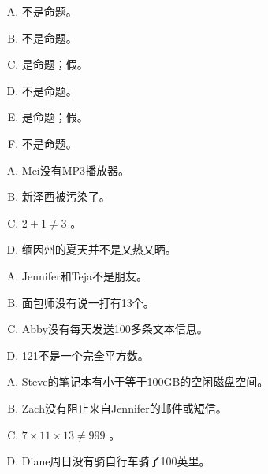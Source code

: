 {{        %
        \begin{practices}
            \begin{enumerate}[A.]
                \item 不是命题。
                \item 不是命题。
                \item 是命题；假。
                \item 不是命题。
                \item 是命题；假。
                \item 不是命题。
            \end{enumerate}
        \end{practices}

        \begin{practices}
            \begin{enumerate}[A.]
                \item Mei没有MP3播放器。
                \item 新泽西被污染了。
                \item $2 + 1 \neq 3$ 。
                \item 缅因州的夏天并不是又热又晒。
            \end{enumerate}
        \end{practices}

        \begin{practices}
            \begin{enumerate}[A.]
                \item Jennifer和Teja不是朋友。
                \item 面包师没有说一打有13个。
                \item Abby没有每天发送100多条文本信息。
                \item 121不是一个完全平方数。
            \end{enumerate}
        \end{practices}

        \begin{practices}
            \begin{enumerate}[A.]
                \item Steve的笔记本有小于等于100GB的空闲磁盘空间。
                \item Zach没有阻止来自Jennifer的邮件或短信。
                \item $7 \times 11 \times 13 \neq 999$ 。
                \item Diane周日没有骑自行车骑了100英里。
            \end{enumerate}
        \end{practices}

}}
